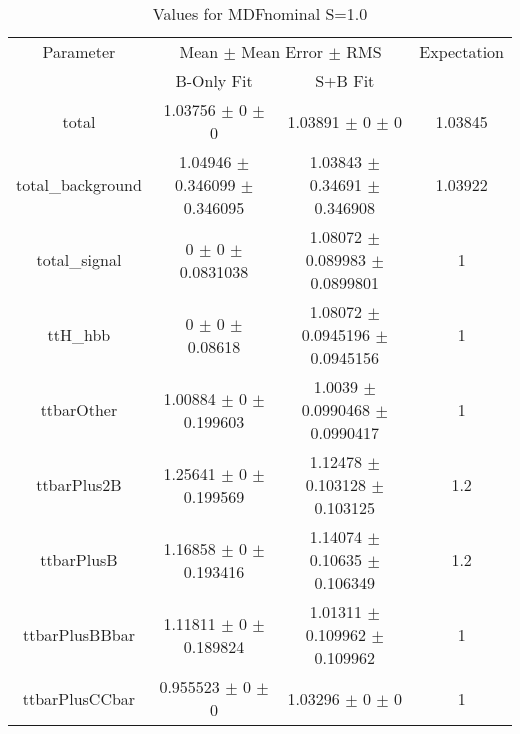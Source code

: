\begin{table}
\centering
\caption{Values for MDFnominal S=1.0}
\begin{tabular}{cccc}
\toprule
Parameter & \multicolumn{2}{c}{Mean $\pm$ Mean Error $\pm$ RMS} & Expectation\\
 & B-Only Fit & S+B Fit & \\
\midrule
total & \num{1.03756} $\pm$ \num{0} $\pm$ \num{0} & \num{1.03891} $\pm$ \num{0} $\pm$ \num{0} & \num{1.03845}\\
total\_background & \num{1.04946} $\pm$ \num{0.346099} $\pm$ \num{0.346095} & \num{1.03843} $\pm$ \num{0.34691} $\pm$ \num{0.346908} & \num{1.03922}\\
total\_signal & \num{0} $\pm$ \num{0} $\pm$ \num{0.0831038} & \num{1.08072} $\pm$ \num{0.089983} $\pm$ \num{0.0899801} & \num{1}\\
ttH\_hbb & \num{0} $\pm$ \num{0} $\pm$ \num{0.08618} & \num{1.08072} $\pm$ \num{0.0945196} $\pm$ \num{0.0945156} & \num{1}\\
ttbarOther & \num{1.00884} $\pm$ \num{0} $\pm$ \num{0.199603} & \num{1.0039} $\pm$ \num{0.0990468} $\pm$ \num{0.0990417} & \num{1}\\
ttbarPlus2B & \num{1.25641} $\pm$ \num{0} $\pm$ \num{0.199569} & \num{1.12478} $\pm$ \num{0.103128} $\pm$ \num{0.103125} & \num{1.2}\\
ttbarPlusB & \num{1.16858} $\pm$ \num{0} $\pm$ \num{0.193416} & \num{1.14074} $\pm$ \num{0.10635} $\pm$ \num{0.106349} & \num{1.2}\\
ttbarPlusBBbar & \num{1.11811} $\pm$ \num{0} $\pm$ \num{0.189824} & \num{1.01311} $\pm$ \num{0.109962} $\pm$ \num{0.109962} & \num{1}\\
ttbarPlusCCbar & \num{0.955523} $\pm$ \num{0} $\pm$ \num{0} & \num{1.03296} $\pm$ \num{0} $\pm$ \num{0} & \num{1}\\
\bottomrule
\end{tabular}
\end{table}